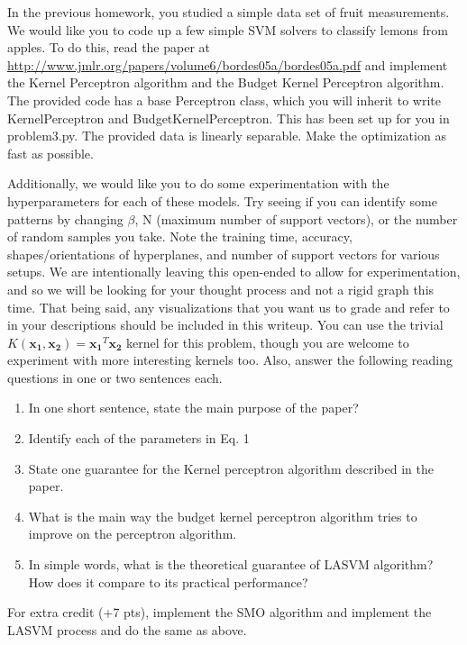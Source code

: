 \documentclass[submit]{harvardml}
\begin{document}
\newpage
\begin{problem}



In the previous homework, you studied a simple data set of fruit measurements.
We would like you to code up a few simple SVM solvers to classify lemons from
apples. To do this, read the paper at
\url{http://www.jmlr.org/papers/volume6/bordes05a/bordes05a.pdf} and implement
the Kernel Perceptron algorithm and the Budget Kernel Perceptron algorithm. The provided code has a base Perceptron class, which you will inherit to write KernelPerceptron and BudgetKernelPerceptron. This has been set up for you in problem3.py. The provided data is linearly separable. Make the optimization as fast as
possible. 

Additionally, we would like you to do some experimentation with the hyperparameters for each of these models. Try seeing if you can identify some patterns by changing $\beta$, N (maximum number of support vectors), or the number of random samples you take.  Note the training time, accuracy,  shapes/orientations of hyperplanes, and number of support vectors for various setups. We are intentionally leaving this open-ended to allow for experimentation, and so we will be looking for your thought process and not a rigid graph this time. That being said, any visualizations that you want us to grade and refer to in your descriptions should be included in this writeup. You can use the trivial $K(\mathbf{x_1}, \mathbf{x_2}) = \mathbf{x_1}^T\mathbf{x_2}$ kernel for this problem, though you are welcome to experiment with more interesting kernels too. Also, answer the following reading questions in one or two sentences each.

\begin{enumerate}
\item In one short sentence, state the main purpose of the paper?
\item Identify each of the parameters in Eq. 1
\item State one guarantee for the Kernel perceptron algorithm described in the
  paper.
\item What is the main way the budget kernel perceptron algorithm tries to
  improve on the perceptron algorithm.
\item In simple words, what is the theoretical guarantee of LASVM algorithm? How
  does it compare to its practical performance?
\end{enumerate}


For extra credit (+7 pts), implement the SMO algorithm and implement the LASVM process and do the same as above.




\end{problem}
\end{document}

